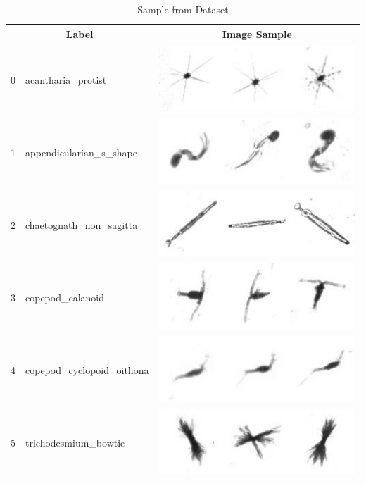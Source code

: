 \documentclass[11pt,oneside,a4paper]{article}
\numberwithin{equation}{section}
\begin{document}
\begin{table}[p]
\centering
\small
\caption{Sample from Dataset}
\begin{tabular}{m{3pt} m{130pt} m{120pt}}
\toprule
\multicolumn{2}{c}{Label} & \multicolumn{1}{c}{Image Sample}\\
\midrule
0 & acantharia\_protist & \includegraphics[scale=0.4]{./fig/acantharia_protist.png}\\
1 & appendicularian\_s\_shape & \includegraphics[scale=0.4]{./fig/appendicularian_s_shape.png}\\
2 & chaetognath\_non\_sagitta & \includegraphics[scale=0.4]{./fig/chaetognath_non_sagitta.png}\\
3 & copepod\_calanoid & \includegraphics[scale=0.4]{./fig/copepod_calanoid.png}\\
4 & copepod\_cyclopoid\_oithona & \includegraphics[scale=0.4]{./fig/copepod_cyclopoid_oithona.png}\\
5 & trichodesmium\_bowtie & \includegraphics[scale=0.4]{./fig/trichodesmium_bowtie.png}\\

\end{tabular}
\end{table}
\end{document}
